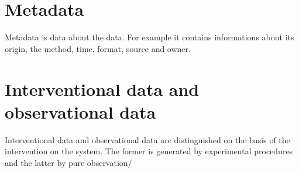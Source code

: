 \section{Metadata}
Metadata is data about the data.
For example it contains informations about its origin, the method, time, format, source and owner.

\section{Interventional data and observational data}
Interventional data and observational data are distinguished on the basis of the intervention on the system.
The former is generated by experimental procedures and the latter by pure observation/
